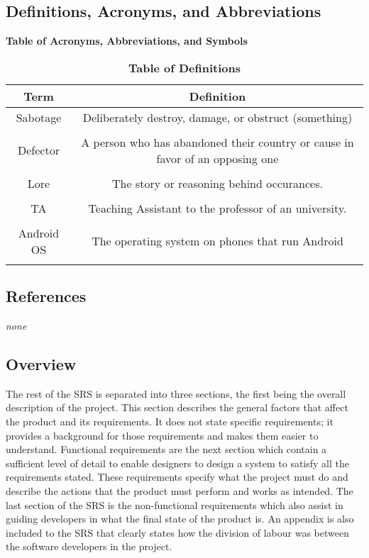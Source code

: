\documentclass[12pt, titlepage]{article}
\newcommand\tab[1][1cm]{\hspace*{#1}}
\begin{document}
\subsection{Definitions, Acronyms, and Abbreviations}
\label{sub:definitions_acronyms_and_abbreviations}
\begin{table}[h!]
\centering
\caption{\bf Table of Acronyms, Abbreviations, and Symbols}


\centering
\caption{\bf Table of Definitions}

\begin{tabular}{|c|c|}
\hline
{\bf Term} & {\bf Definition}\\
\hline
{Sabotage} & {Deliberately destroy, damage, or obstruct (something)}\\
{} & {}\\
\hline
{Defector} & {A person who has abandoned their country or cause in favor of an opposing one}\\
{} & {}\\
\hline
{Lore} & {The story or reasoning behind occurances. }\\
{} & {}\\
\hline
{TA} & {Teaching Assistant to the professor of an university.}\\
{} & {}\\
\hline
{Android OS} & {The operating system on phones that run Android}\\
{} & {}\\
\hline
\end{tabular}

\end{table}
\newpage
\subsection{References}
\label{sub:references}
\emph{none}

\subsection{Overview}
\label{sub:overview}
\tab The rest of the SRS is separated into three sections, the first being the overall description of the project. This section describes the general factors that affect the product and its requirements. It does not state specific requirements; it provides a background for those requirements and makes them easier to understand. Functional requirements are the next section which contain a sufficient level of detail to enable designers to design a system to satisfy all the requirements stated. These requirements specify what the project must do and describe the actions that the product must perform and works as intended. The last section of the SRS is the non-functional requirements which also assist in guiding developers in what the final state of the product is. An appendix is also included to the SRS that clearly states how the division of labour was between the software developers in the project.
\end{document}
